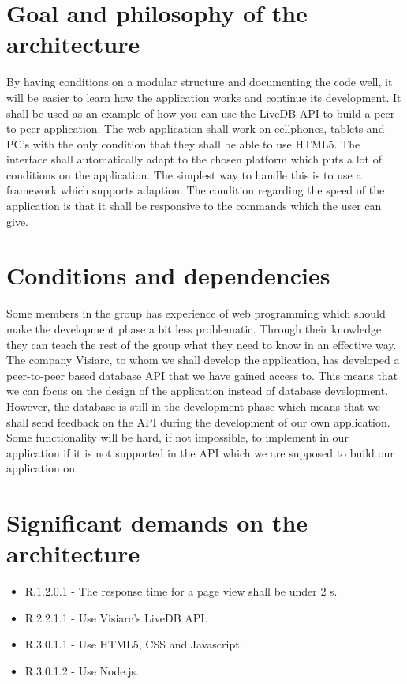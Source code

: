 \documentclass[a4paper, 12pt, titlepage]{article}
\begin{document}
\section{Goal and philosophy of the architecture}
By having conditions on a modular structure and documenting the code well, it will be easier to learn how the application works and continue its development. It shall be used as an  example of how you can use the LiveDB API to build a peer-to-peer application.
The web application shall work on cellphones, tablets and PC's with the only condition that they shall be able to use HTML5. The interface shall automatically adapt to the chosen platform which puts a lot of conditions on the application. The simplest way to handle this is to use a framework which supports adaption. The condition regarding the speed of the application is that it shall be responsive to the commands which the user can give.


\section{Conditions and dependencies}
Some members in the group has experience of web programming which should make the development phase a bit less problematic. Through their knowledge they can teach the rest of the group what they need to know in an effective way. The company Visiarc, to whom we shall develop the application, has developed a peer-to-peer based database API that we have gained access to. This means that we can focus on the design of the application instead of database development. However, the database is still in the development phase which means that we shall send feedback on the API during the development of our own application. Some functionality will be hard, if not impossible, to implement in our application if it is not supported in the API which we are supposed to build our application on.

\newpage
\section{Significant demands on the architecture}

\begin{itemize}
\cbstart
\item R.1.2.0.1 - The response time for a page view shall be under 2 s.
\item R.2.2.1.1 - Use Visiarc's LiveDB API.
\item R.3.0.1.1 - Use HTML5, CSS and Javascript.
\item R.3.0.1.2 - Use Node.js.
\cbend
\end{itemize}
\end{document}
